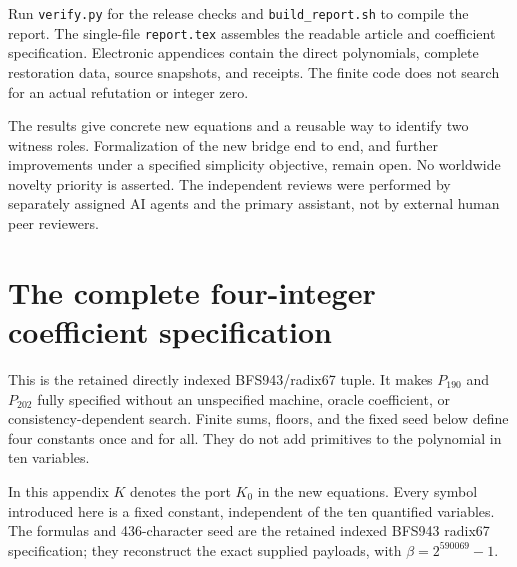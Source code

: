 \documentclass[11pt]{article}
\theoremstyle{remark}
\begin{document}
Run \texttt{verify.py} for the release checks and
\texttt{build\_report.sh} to compile the report.
The single-file \texttt{report.tex} assembles the readable article and
coefficient specification. Electronic appendices contain the direct
polynomials, complete restoration data, source snapshots, and receipts.
The finite code does not search for an actual refutation or integer zero.

The results give concrete new equations and a reusable way to identify
two witness roles. Formalization of the new bridge end to end, and
further improvements under a specified simplicity objective, remain open.
No worldwide novelty priority is asserted.
The independent reviews were performed by separately assigned AI agents
and the primary assistant, not by external human peer reviewers.

\appendix
\section{The complete four-integer coefficient specification}\label{app:constants}
This is the retained directly indexed BFS943/radix67 tuple.
It makes \(P_{190}\) and \(P_{202}\) fully specified without an unspecified
machine, oracle coefficient, or consistency-dependent search.
Finite sums, floors, and the fixed seed below define four constants once
and for all. They do not add primitives to the polynomial in ten variables.

\begingroup
\providecommand{\fl}[1]{\left\lfloor#1\right\rfloor}
\providecommand{\rg}[2]{\{#1,\ldots,#2\}}
In this appendix $K$ denotes the port $K_0$ in the new equations.
Every symbol introduced here is a fixed constant, independent of the ten
quantified variables. The formulas and 436-character seed are the retained
indexed BFS943 radix67 specification; they reconstruct the exact supplied
payloads, with $\beta=2^{590069}-1$.
\end{document}
